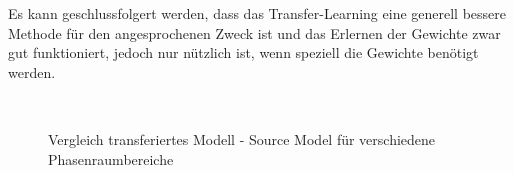 Es kann geschlussfolgert werden, dass das Transfer-Learning eine generell bessere Methode für den angesprochenen Zweck ist und das Erlernen der Gewichte zwar gut funktioniert, jedoch nur nützlich ist, wenn speziell die Gewichte benötigt werden.
\begin{figure}[hb!]
	\centering
	 \\
	\caption{Vergleich transferiertes Modell - Source Model für verschiedene Phasenraumbereiche}
	\label{Vgl-transfer-not-rw}
\end{figure}

